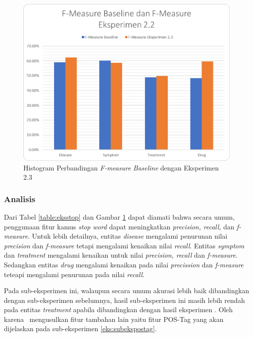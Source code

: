 	\begin{figure}
		\centering
		\includegraphics[width=0.85\linewidth]{images/histogram3}
		\caption{Histogram Perbandingan \textit{F-measure} \textit{Baseline} dengan Eksperimen 2.3}
		\label{fig:eksstop}
	\end{figure}

	\subsubsection{Analisis}
	
	Dari Tabel \ref{table:eksstop} dan Gambar \ref{fig:eksstop} dapat diamati bahwa secara umum, penggunaan fitur kamus \textit{stop word} dapat meningkatkan \textit{precision, recall,} dan \textit{f-measure}. Untuk lebih detailnya, entitas \textit{disease} mengalami penurunan nilai \textit{precision} dan \textit{f-measure} tetapi mengalami kenaikan nilai \textit{recall}. Entitas \textit{symptom} dan \textit{treatment} mengalami kenaikan untuk nilai \textit{precision, recall} dan \textit{f-measure}. Sedangkan entitas \textit{drug} mengalami kenaikan pada nilai \textit{precission} dan \textit{f-measure} teteapi mengalami penurunan pada nilai \textit{recall}.
		
	Pada sub-eksperimen ini, walaupun secara umum akurasi lebih baik dibandingkan dengan sub-eksperimen sebelumnya, hasil sub-eksperimen ini masih lebih rendah pada entitas \textit{treatment} apabila dibandingkan dengan hasil eksperimen \cite{skripsiKakRadit}. Oleh karena \saya~mengusulkan fitur tambahan lain yaitu fitur POS-Tag yang akan dijelaskan pada sub-eksperimen \ref{eks:subekspostag}.
	
